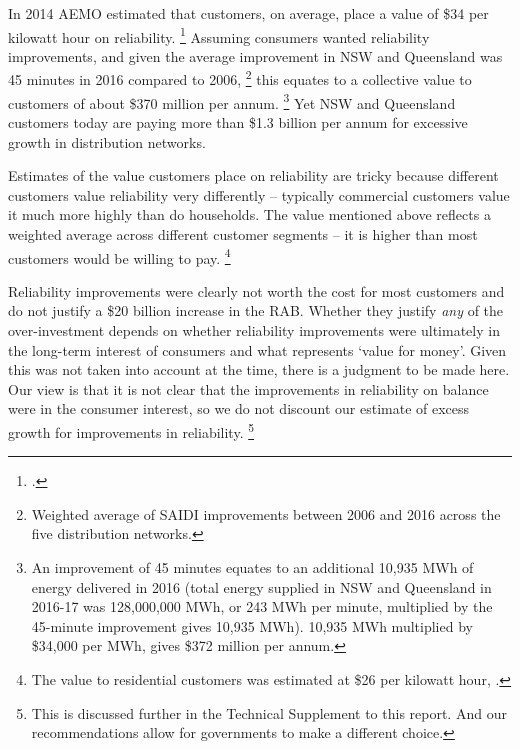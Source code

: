 \documentclass[FrontPage]{grattan}
\begin{document}

In 2014 AEMO estimated that customers, on average, place a value of \$34 per kilowatt hour on reliability.%
\footcite{AEMO2014ValueOfCustomerReliability}
Assuming consumers wanted reliability improvements, and given the average improvement in NSW and Queensland was 45 minutes in 2016 compared to 2006,%
\footnote{Weighted average of SAIDI improvements between 2006 and 2016 across the five distribution networks.}
this equates to a collective value to customers of about \$370 million per annum.%
\footnote{An improvement of 45 minutes equates to an additional 10,935 MWh of energy delivered in 2016 (total energy supplied in NSW and Queensland in 2016-17 was 128,000,000 MWh, or 243 MWh per minute, multiplied by the 45-minute improvement gives 10,935 MWh). 10,935 MWh multiplied by \$34,000 per MWh, gives \$372 million per annum.}
Yet NSW and Queensland customers today are paying more than \$1.3 billion per annum for excessive growth in distribution networks.

Estimates of the value customers place on reliability are tricky because different customers value reliability very differently -- typically commercial customers value it much more highly than do households. The value mentioned above reflects a weighted average across different customer segments -- it is higher than most customers would be willing to pay.%
\footnote{The value to residential customers was estimated at \$26 per kilowatt hour, \textcite{AEMO2014ValueOfCustomerReliability}.}

Reliability improvements were clearly not worth the cost for most customers and do not justify a \$20 billion increase in the RAB\@. Whether they justify \emph{any} of the over-investment depends on whether reliability improvements were ultimately in the long-term interest of consumers and what represents `value for money'. Given this was not taken into account at the time, there is a judgment to be made here. Our view is that it is not clear that the improvements in reliability on balance were in the consumer interest, so we do not discount our estimate of excess growth for improvements in reliability.%
\footnote{This is discussed further in the Technical Supplement to this report. And our recommendations allow for governments to make a different choice.} 
\end{document}

